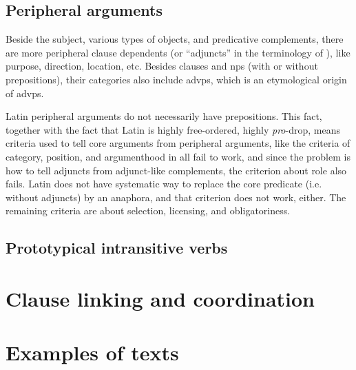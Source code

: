 \documentclass[UTF8, a4paper, oneside]{report}
\newcommand*{\citesec}[1]{\S~{#1}}
\newcommand*{\term}[1]{\emph{#1}}
\begin{document}
\section{Peripheral arguments}

Beside the subject, various types of objects, and predicative complements,
there are more peripheral clause dependents
(or ``adjuncts'' in the terminology of \citet{cgel}),
like purpose, direction, location, etc.
Besides clauses and \ac{np}s (with or without prepositions),
their categories also include \ac{advp}s,
which is an etymological origin of \ac{advp}s.

Latin peripheral arguments do not necessarily have prepositions.
This fact, together with the fact that Latin is highly free-ordered, 
highly \term{pro}-drop,
means criteria used to tell core arguments from peripheral arguments, 
like the criteria of category, position, and argumenthood in \citet[\citesec{4.1.2}]{cgel} 
all fail to work,
and since the problem is how to tell adjuncts from adjunct-like complements,
the criterion about role also fails.
Latin does not have systematic way to replace the core predicate (i.e. without adjuncts) by an anaphora,
and that criterion does not work, either.
The remaining criteria are about selection, licensing, and obligatoriness.


\section{Prototypical intransitive verbs}

\chapter{Clause linking and coordination}

\chapter{Examples of texts}



\end{document}
